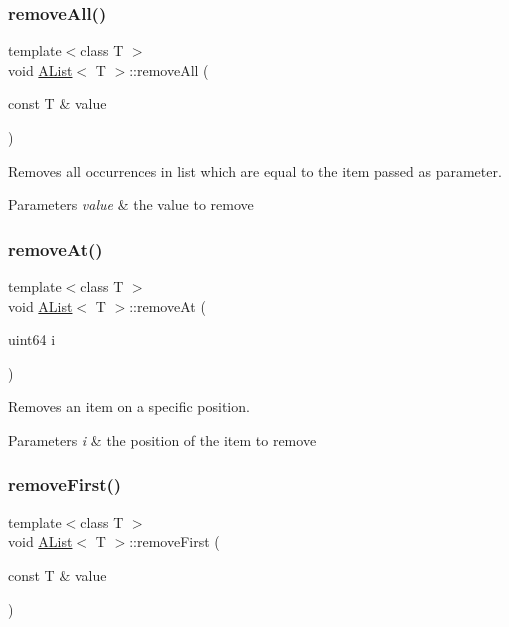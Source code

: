 \subsubsection{\texorpdfstring{removeAll()}{removeAll()}}
{\footnotesize\ttfamily template$<$class T $>$ \\
void \mbox{\hyperlink{class_a_list}{A\+List}}$<$ T $>$\+::remove\+All (\begin{DoxyParamCaption}\item[{const T \&}]{value }\end{DoxyParamCaption})}



Removes all occurrences in list which are equal to the item passed as parameter. 


\begin{DoxyParams}{Parameters}
{\em value} & the value to remove \\
\hline
\end{DoxyParams}
\mbox{\label{class_a_list_a4c5d1f1c0c6c8da99ac6279f1fea6a88}} 
\subsubsection{\texorpdfstring{removeAt()}{removeAt()}}
{\footnotesize\ttfamily template$<$class T $>$ \\
void \mbox{\hyperlink{class_a_list}{A\+List}}$<$ T $>$\+::remove\+At (\begin{DoxyParamCaption}\item[{uint64}]{i }\end{DoxyParamCaption})}



Removes an item on a specific position. 


\begin{DoxyParams}{Parameters}
{\em i} & the position of the item to remove \\
\hline
\end{DoxyParams}
\mbox{\label{class_a_list_aa4ac4af0fb772a55168ddcba13c508c3}} 
\subsubsection{\texorpdfstring{removeFirst()}{removeFirst()}}
{\footnotesize\ttfamily template$<$class T $>$ \\
void \mbox{\hyperlink{class_a_list}{A\+List}}$<$ T $>$\+::remove\+First (\begin{DoxyParamCaption}\item[{const T \&}]{value }\end{DoxyParamCaption})}




